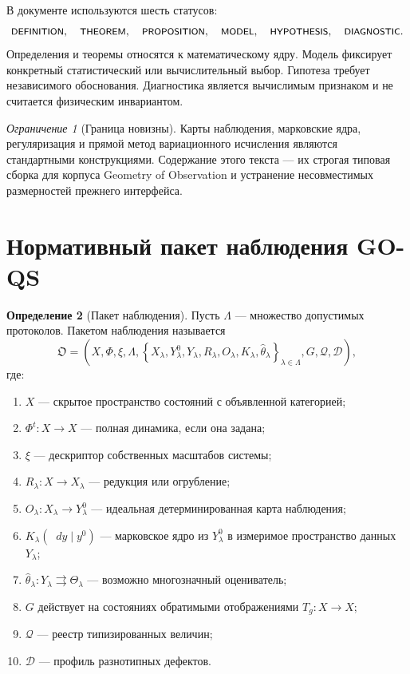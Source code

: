\documentclass[11pt,a4paper]{article}
\theoremstyle{definition}
\newtheorem{definition}{Определение}[section]
\theoremstyle{plain}
\theoremstyle{remark}
\newtheorem{warning}[definition]{Ограничение}
\newcommand{\Qreg}{\mathcal{Q}}
\newcommand{\Dprof}{\mathscr{D}}
\newcommand{\dd}{\mathop{}\!d}
\newcommand{\set}[1]{\left\{#1\right\}}
\newcommand{\status}[1]{\textsf{\footnotesize #1}}
\begin{document}
В документе используются шесть статусов:
\[
\status{DEFINITION},\quad
\status{THEOREM},\quad
\status{PROPOSITION},\quad
\status{MODEL},\quad
\status{HYPOTHESIS},\quad
\status{DIAGNOSTIC}.
\]
Определения и теоремы относятся к математическому ядру. Модель фиксирует
конкретный статистический или вычислительный выбор. Гипотеза требует
независимого обоснования. Диагностика является вычислимым признаком и не
считается физическим инвариантом.

\begin{warning}[Граница новизны]
Карты наблюдения, марковские ядра, регуляризация и прямой метод
вариационного исчисления являются стандартными конструкциями. Содержание
этого текста --- их строгая типовая сборка для корпуса Geometry of
Observation и устранение несовместимых размерностей прежнего интерфейса.
\end{warning}

\section{Нормативный пакет наблюдения GO-QS}

\begin{definition}[Пакет наблюдения]
Пусть $\Lambda$ --- множество допустимых протоколов. Пакетом наблюдения
называется
\[
\mathfrak O=
\left(
X,\Phi,\xi,\Lambda,
\set{X_\lambda,Y_\lambda^0,Y_\lambda,
R_\lambda,O_\lambda,K_\lambda,\widehat\theta_\lambda}_{\lambda\in\Lambda},
G,\Qreg,\Dprof
\right),
\]
где:
\begin{enumerate}[leftmargin=*]
\item $X$ --- скрытое пространство состояний с объявленной категорией;
\item $\Phi^t:X\to X$ --- полная динамика, если она задана;
\item $\xi$ --- дескриптор собственных масштабов системы;
\item $R_\lambda:X\to X_\lambda$ --- редукция или огрубление;
\item $O_\lambda:X_\lambda\to Y_\lambda^0$ --- идеальная
детерминированная карта наблюдения;
\item $K_\lambda(\dd y\mid y^0)$ --- марковское ядро из $Y_\lambda^0$ в
измеримое пространство данных $Y_\lambda$;
\item $\widehat\theta_\lambda:Y_\lambda\rightrightarrows\Theta_\lambda$ ---
возможно многозначный оцениватель;
\item $G$ действует на состояниях обратимыми отображениями $T_g:X\to X$;
\item $\Qreg$ --- реестр типизированных величин;
\item $\Dprof$ --- профиль разнотипных дефектов.
\end{enumerate}
\end{definition}
\end{document}
